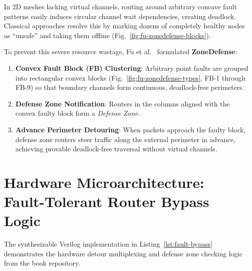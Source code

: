 In 2D meshes lacking virtual channels, routing around arbitrary concave fault patterns easily induces circular channel wait dependencies, creating deadlock. Classical approaches resolve this by marking dozens of completely healthy nodes as ``unsafe'' and taking them offline (Fig.~\ref{fig:fu-zonedefense-blocks}).

To prevent this severe resource wastage, Fu et al.~\cite{Fu2014} formulated \textbf{ZoneDefense}:
\begin{enumerate}
    \item \textbf{Convex Fault Block (FB) Clustering}: Arbitrary point faults are grouped into rectangular convex blocks (Fig.~\ref{fig:fu-zonedefense-types}, FB-1 through FB-9) so that boundary channels form continuous, deadlock-free perimeters.
    \item \textbf{Defense Zone Notification}: Routers in the columns aligned with the convex faulty block form a \emph{Defense Zone}.
    \item \textbf{Advance Perimeter Detouring}: When packets approach the faulty block, defense zone routers steer traffic along the external perimeter in advance, achieving provable deadlock-free traversal without virtual channels.
\end{enumerate}

\section{Hardware Microarchitecture: Fault-Tolerant Router Bypass Logic}
\label{sec:hardware-bypass}

The synthesizable Verilog implementation in Listing~\ref{lst:fault-bypass} demonstrates the hardware detour multiplexing and defense zone checking logic from the book repository.

